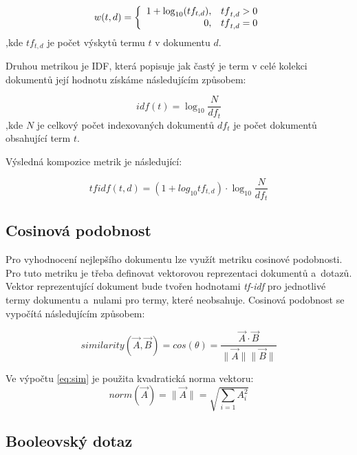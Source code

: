 \documentclass[12pt, a4paper]{article}
\begin{document}
\begin{equation}
w(t,d) = \left\{ \begin{array}{r@{\quad}c}
    1 + \log_{10}(tf_{t,d}), & {tf}_{t,d} > 0 \\
    0, & {tf}_{t,d} = 0 \\ \end{array} \right.
\end{equation}
,kde $tf_{t,d}$ je počet výskytů termu $t$ v dokumentu $d$.

Druhou metrikou je IDF, která popisuje jak častý je term v celé kolekci dokumentů její hodnotu získáme následujícím způsobem:

\begin{equation}
idf(t) = \log_{10}\frac{N}{df_{t}}
\end{equation}
,kde $N$ je celkový počet indexovaných dokumentů $df_{t}$ je počet dokumentů obsahující term $t$.


Výsledná kompozice metrik je následující:

\begin{equation}
tfidf(t,d) = (1 + log_{10}tf_{t,d}) \cdot \log_{10}\frac{N}{df_{t}}
\end{equation}


\subsection{Cosinová podobnost}

Pro vyhodnocení nejlepšího dokumentu lze využít metriku cosinové podobnosti. Pro tuto metriku je třeba definovat vektorovou reprezentaci dokumentů a~dotazů. Vektor reprezentující dokument bude tvořen hodnotami \emph{tf-idf} pro jednotlivé termy dokumentu a~nulami pro termy, které neobsahuje. Cosinová podobnost se vypočítá následujícím způsobem:

\begin{equation}
\label{eq:sim}
 similarity(\vec{A}, \vec{B}) = cos(\theta) = \frac{\vec{A} \cdot \vec{B}}{\parallel\vec{A}\parallel\parallel\vec{B}\parallel} 
\end{equation}

Ve výpočtu \ref{eq:sim} je použita kvadratická norma vektoru:
\begin{equation}
 norm(\vec{A}) = \parallel\vec{A}\parallel = \sqrt{\sum_{i=1} A_{i}^{2}} 
\end{equation}

\subsection{Booleovský dotaz}
\end{document}
